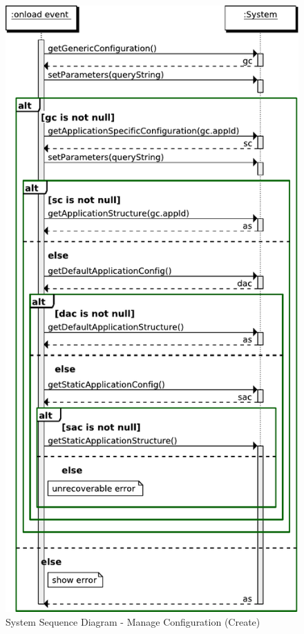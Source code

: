 \begin{figure}[htb]
    \centering
    \includegraphics{figures/spec-seq-manage-conf-create.pdf}
    \caption{System Sequence Diagram - Manage Configuration (Create)}
    \label{fig:spec-manage-conf-create}
\end{figure}

